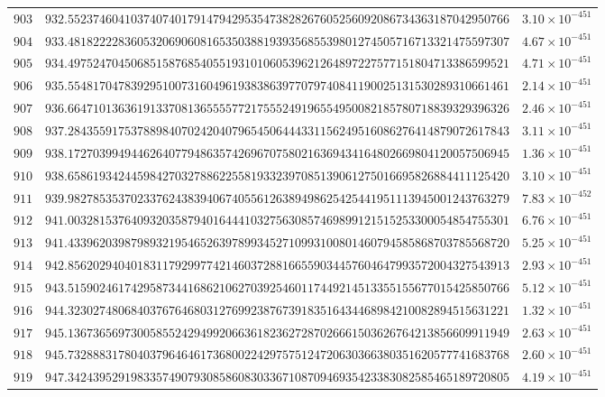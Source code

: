 \documentclass[12pt,reqno]{amsart}
\theoremstyle{remark}
\begin{document}
\begin{longtable}{clc}
$903$ & $932.5523746041037407401791479429535473828267605256092086734363187042950766$ & $3.10\times 10^{-451}$ \\
$904$ & $933.4818222283605320690608165350388193935685539801274505716713321475597307$ & $4.67\times 10^{-451}$ \\
$905$ & $934.4975247045068515876854055193101060539621264897227577151804713386599521$ & $4.71\times 10^{-451}$ \\
$906$ & $935.5548170478392951007316049619383863977079740841190025131530289310661461$ & $2.14\times 10^{-451}$ \\
$907$ & $936.6647101363619133708136555577217555249196554950082185780718839329396326$ & $2.46\times 10^{-451}$ \\
$908$ & $937.2843559175378898407024204079654506444331156249516086276414879072617843$ & $3.11\times 10^{-451}$ \\
$909$ & $938.1727039949446264077948635742696707580216369434164802669804120057506945$ & $1.36\times 10^{-451}$ \\
$910$ & $938.6586193424459842703278862255819332397085139061275016695826884411125420$ & $3.10\times 10^{-451}$ \\
$911$ & $939.9827853537023376243839406740556126389498625425441951113945001243763279$ & $7.83\times 10^{-452}$ \\
$912$ & $941.0032815376409320358794016444103275630857469899121515253300054854755301$ & $6.76\times 10^{-451}$ \\
$913$ & $941.4339620398798932195465263978993452710993100801460794585868703785568720$ & $5.25\times 10^{-451}$ \\
$914$ & $942.8562029404018311792997742146037288166559034457604647993572004327543913$ & $2.93\times 10^{-451}$ \\
$915$ & $943.5159024617429587344168621062703925460117449214513355155677015425850766$ & $5.12\times 10^{-451}$ \\
$916$ & $944.3230274806840376764680312769923876739183516434468984210082894515631221$ & $1.32\times 10^{-451}$ \\
$917$ & $945.1367365697300585524294992066361823627287026661503626764213856609911949$ & $2.63\times 10^{-451}$ \\
$918$ & $945.7328883178040379646461736800224297575124720630366380351620577741683768$ & $2.60\times 10^{-451}$ \\
$919$ & $947.3424395291983357490793085860830336710870946935423383082585465189720805$ & $4.19\times 10^{-451}$ \\

\end{longtable}
\end{document}
